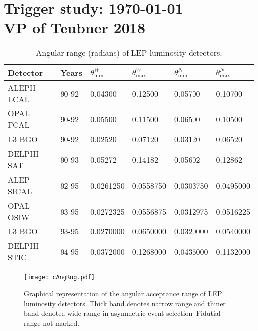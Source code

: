 \documentclass[12pt]{article}
\begin{document}



\newpage
\section{Trigger study: \today \\ VP of Teubner 2018}


\begin{table}[!h]
\begin{center}
\begin{tabular}{||l|l|l|l|l|l||}
\hline\hline
 Detector  & Years& $\theta^W_{\min}$ & $\theta^W_{\max}$ &  $\theta^N_{\min}$ & $\theta^N_{\max}$ 
\\ \hline
ALEPH LCAL & 90-92  &  0.04300      &  0.12500     &   0.05700     &   0.10700   \\
OPAL  FCAL & 90-92  &  0.05500      &  0.11500     &   0.06500     &   0.10500   \\
L3 BGO     & 90-92  &  0.02520      &  0.07120     &   0.03120     &   0.06520    \\
DELPHI SAT & 90-93  &  0.05272      &  0.14182     &   0.05602     &   0.12862   \\
\hline
ALEP SICAL & 92-95  &  0.0261250    &  0.0558750   &   0.0303750   &   0.0495000 \\
OPAL OSIW  & 93-95  &  0.0272325    &  0.0556875   &   0.0312975   &   0.0516225 \\
L3   BGO   & 93-95  &  0.0270000    &  0.0650000   &   0.0320000   &   0.0540000  \\
DELPHI STIC& 94-95  &  0.0372000    &  0.1268000   &   0.0436000   &   0.1132000  \\
\hline\hline
\end{tabular}
\end{center}
\caption{\sf
 Angular range (radians) of LEP luminosity detectors.
 }
\end{table}


\begin{figure}[!h]
  \centering
  \texttt{[image: cAngRng.pdf]}
  \caption{\sf
  Graphical representation of the angular acceptance range of LEP luminosity detectors.
  Thick band denotes narrow range and thiner band denoted wide range
  in asymmetric event selection.
  Fidutial range not marked.
  }
  \label{fig:cPrag2}
\end{figure}
\vfill
\end{document}
